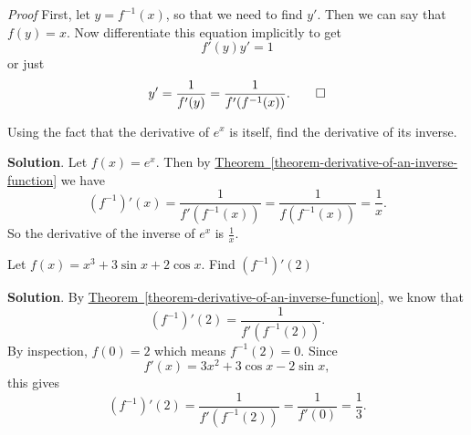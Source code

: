 \documentclass[10pt,]{book}
\makeatletter
\theoremstyle{ptxplainnotitle}
\theoremstyle{ptxplaintitle}
\theoremstyle{ptxplainnotitle}
\theoremstyle{ptxplaintitle}
\theoremstyle{ptxplainnotitle}
\theoremstyle{ptxplaintitle}
\renewcommand*{\proofname}{Proof}
\renewenvironment{proof}[1][\proofname]{\par
  \pushQED{\qed}%
  \normalfont \topsep6\p@\@plus6\p@\relax
  \trivlist
  \item\relax
    {\itshape
    #1\@addpunct{.}}\hspace\labelsep\ignorespaces
}{%
  \popQED\endtrivlist\@endpefalse
}
\theoremstyle{ptxdefinitionnotitle}
\theoremstyle{ptxdefinitiontitle}
\theoremstyle{ptxdefinitionnotitle}
\theoremstyle{ptxdefinitiontitle}
\theoremstyle{ptxdefinitionnotitle}
\theoremstyle{ptxdefinitiontitle}
\theoremstyle{ptxdefinitionnotitle}
\theoremstyle{ptxdefinitiontitle}
\theoremstyle{ptxdefinitionnotitle}
\theoremstyle{ptxdefinitiontitle}
\numberwithin{equation}{section}
\makeatother
\begin{document}
\begin{proof}\hypertarget{proof-4}{}
\hypertarget{p-212}{}%
First, let \(y = f^{-1}(x)\), so that we need to find \(y'\). Then we can say that \(f(y) = x\). Now differentiate this equation implicitly to get%
\begin{equation*}
f'(y)y' = 1
\end{equation*}
or just%
\begin{equation*}
y' = \frac{1}{f'(y)} = \frac{1}{f'(f^{-1}(x))}.\qedhere
\end{equation*}
%
\end{proof}
\begin{example}\label{example-exponential-inverse-revisited}
\hypertarget{p-213}{}%
Using the fact that the derivative of \(e^{x}\) is itself, find the derivative of its inverse.%
\par\smallskip%
\noindent\textbf{Solution}.\hypertarget{solution-46}{}\quad%
\hypertarget{p-214}{}%
Let \(f(x) = e^{x}\). Then by \hyperref[theorem-derivative-of-an-inverse-function]{Theorem~\ref{theorem-derivative-of-an-inverse-function}} we have%
\begin{equation*}
(f^{-1})'(x) = \frac{1}{f'(f^{-1}(x))} = \frac{1}{f(f^{-1}(x))} = \frac{1}{x}.
\end{equation*}
So the derivative of the inverse of \(e^{x}\) is \(\frac{1}{x}\).%
\end{example}
\begin{example}\label{example-derivative-at-a-point}
\hypertarget{p-215}{}%
Let \(f(x) = x^{3} + 3\sin x + 2\cos x\). Find \((f^{-1})'(2)\)%
\par\smallskip%
\noindent\textbf{Solution}.\hypertarget{solution-47}{}\quad%
\hypertarget{p-216}{}%
By \hyperref[theorem-derivative-of-an-inverse-function]{Theorem~\ref{theorem-derivative-of-an-inverse-function}}, we know that%
\begin{equation*}
(f^{-1})'(2) = \frac{1}{f'(f^{-1}(2))}.
\end{equation*}
By inspection, \(f(0) = 2\) which means \(f^{-1}(2) = 0\). Since%
\begin{equation*}
f'(x) = 3x^{2} + 3\cos x - 2\sin x,
\end{equation*}
this gives%
\begin{equation*}
(f^{-1})'(2) = \frac{1}{f'(f^{-1}(2))} = \frac{1}{f'(0)} = \frac{1}{3}.
\end{equation*}
%
\end{example}
\typeout{************************************************}
\typeout{************************************************}
\end{document}
